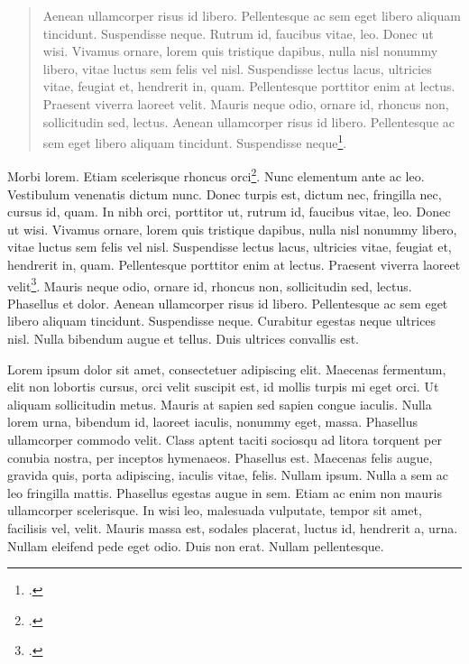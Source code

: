 \documentclass{article}
\begin{document}
\begin{quote}
Aenean ullamcorper risus id libero. Pellentesque ac sem eget libero aliquam tincidunt. Suspendisse neque. Rutrum id, faucibus vitae, leo. Donec ut wisi. Vivamus ornare, lorem quis tristique dapibus, nulla nisl nonummy libero, vitae luctus sem felis vel nisl. Suspendisse lectus lacus, ultricies vitae, feugiat et, hendrerit in, quam. Pellentesque porttitor enim at lectus. Praesent viverra laoreet velit. Mauris neque odio, ornare id, rhoncus non, sollicitudin sed, lectus. Aenean ullamcorper risus id libero. Pellentesque ac sem eget libero aliquam tincidunt. Suspendisse neque\footcite[voir \pno~154]{Georges1974}.
\end{quote}



Morbi lorem. Etiam scelerisque rhoncus orci\footcite{Georges1974}. Nunc elementum ante ac leo. Vestibulum venenatis dictum nunc. Donec turpis est, dictum nec, fringilla nec, cursus id, quam. In nibh orci, porttitor ut, rutrum id, faucibus vitae, leo. Donec ut wisi. Vivamus ornare, lorem quis tristique dapibus, nulla nisl nonummy libero, vitae luctus sem felis vel nisl. Suspendisse lectus lacus, ultricies vitae, feugiat et, hendrerit in, quam. Pellentesque porttitor enim at lectus. Praesent viverra laoreet velit\footcite[56]{Desfois1998}. Mauris neque odio, ornare id, rhoncus non, sollicitudin sed, lectus. Phasellus et dolor. Aenean ullamcorper risus id libero. Pellentesque ac sem eget libero aliquam tincidunt. Suspendisse neque. Curabitur egestas neque ultrices nisl. Nulla bibendum augue et tellus. Duis ultrices convallis est.



Lorem ipsum dolor sit amet, consectetuer adipiscing elit. Maecenas fermentum, elit non lobortis cursus, orci velit suscipit est, id mollis turpis mi eget orci. Ut aliquam sollicitudin metus. Mauris at sapien sed sapien congue iaculis. Nulla lorem urna, bibendum id, laoreet iaculis, nonummy eget, massa. Phasellus ullamcorper commodo velit. Class aptent taciti sociosqu ad litora torquent per conubia nostra, per inceptos hymenaeos. Phasellus est. Maecenas felis augue, gravida quis, porta adipiscing, iaculis vitae, felis. Nullam ipsum. Nulla a sem ac leo fringilla mattis. Phasellus egestas augue in sem. Etiam ac enim non mauris ullamcorper scelerisque. In wisi leo, malesuada vulputate, tempor sit amet, facilisis vel, velit. Mauris massa est, sodales placerat, luctus id, hendrerit a, urna. Nullam eleifend pede eget odio. Duis non erat. Nullam pellentesque.
\end{document}
